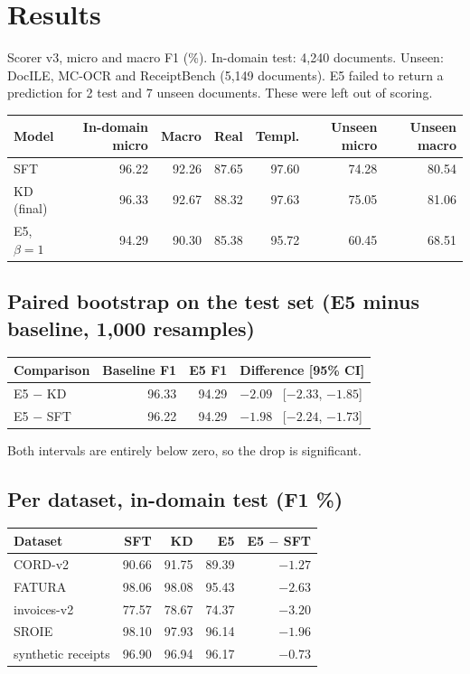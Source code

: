 \documentclass[10pt]{article}
\begin{document}
\section{Results}

Scorer v3, micro and macro F1 (\%). In-domain test: 4{,}240 documents. Unseen: DocILE, MC-OCR and ReceiptBench (5{,}149 documents). E5 failed to return a prediction for 2 test and 7 unseen documents. These were left out of scoring.

\begin{center}
\begin{tabular}{lrrrrrr}
\toprule
Model & In-domain micro & Macro & Real & Templ. & Unseen micro & Unseen macro \\
\midrule
SFT & 96.22 & 92.26 & 87.65 & 97.60 & 74.28 & 80.54 \\
KD (final) & 96.33 & 92.67 & 88.32 & 97.63 & 75.05 & 81.06 \\
E5, $\beta = 1$ & 94.29 & 90.30 & 85.38 & 95.72 & 60.45 & 68.51 \\
\bottomrule
\end{tabular}
\end{center}

\subsection*{Paired bootstrap on the test set (E5 minus baseline, 1{,}000 resamples)}

\begin{center}
\begin{tabular}{lrrl}
\toprule
Comparison & Baseline F1 & E5 F1 & Difference [95\% CI] \\
\midrule
E5 $-$ KD & 96.33 & 94.29 & $-2.09$ \ [$-2.33$, $-1.85$] \\
E5 $-$ SFT & 96.22 & 94.29 & $-1.98$ \ [$-2.24$, $-1.73$] \\
\bottomrule
\end{tabular}
\end{center}

Both intervals are entirely below zero, so the drop is significant.

\subsection*{Per dataset, in-domain test (F1 \%)}

\begin{center}
\begin{tabular}{lrrrr}
\toprule
Dataset & SFT & KD & E5 & E5 $-$ SFT \\
\midrule
CORD-v2 & 90.66 & 91.75 & 89.39 & $-1.27$ \\
FATURA & 98.06 & 98.08 & 95.43 & $-2.63$ \\
invoices-v2 & 77.57 & 78.67 & 74.37 & $-3.20$ \\
SROIE & 98.10 & 97.93 & 96.14 & $-1.96$ \\
synthetic receipts & 96.90 & 96.94 & 96.17 & $-0.73$ \\
\bottomrule
\end{tabular}
\end{center}
\end{document}
